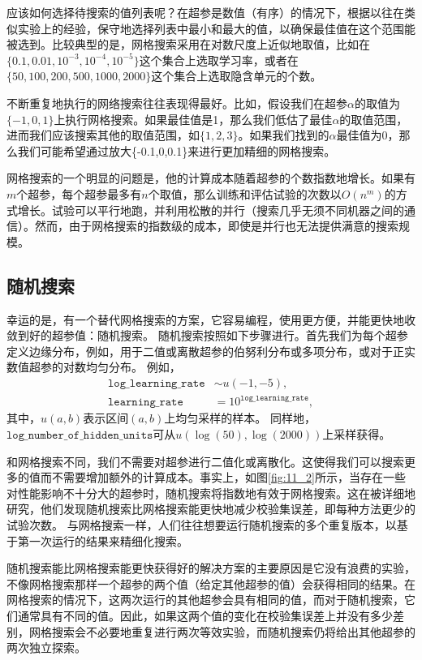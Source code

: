 应该如何选择待搜索的值列表呢？在超参是数值（有序）的情况下，根据以往在类似实验上的经验，保守地选择列表中最小和最大的值，以确保最佳值在这个范围能被选到。比较典型的是，网格搜索采用在对数尺度上近似地取值，比如在$\{0.1,0.01,10^{-3},10^{-4},10^{-5}\}$这个集合上选取学习率，或者在$\{50,100,200,500,1000,2000\}$这个集合上选取隐含单元的个数。

不断重复地执行的网络搜索往往表现得最好。比如，假设我们在超参$\alpha$的取值为$\{-1,0,1\}$上执行网格搜索。如果最佳值是1，那么我们低估了最佳$\alpha$的取值范围，进而我们应该搜索其他的取值范围，如$\{1,2,3\}$。如果我们找到的$\alpha$最佳值为0，那么我们可能希望通过放大\{-0.1,0,0.1\}来进行更加精细的网格搜索。

网格搜索的一个明显的问题是，他的计算成本随着超参的个数指数地增长。如果有$m$个超参，每个超参最多有$n$个取值，那么训练和评估试验的次数以$O(n^m)$的方式增长。试验可以平行地跑，并利用松散的并行（搜索几乎无须不同机器之间的通信）。然而，由于网格搜索的指数级的成本，即使是并行也无法提供满意的搜索规模。

\subsection{随机搜索}
\label{sec:11.4.4}

幸运的是，有一个替代网格搜索的方案，它容易编程，使用更方便，并能更快地收敛到好的超参值：随机搜索\citep{Bergstra+Bengio-2012-small}。
随机搜索按照如下步骤进行。首先我们为每个超参定义边缘分布，例如，用于二值或离散超参的伯努利分布或多项分布，或对于正实数值超参的对数均匀分布。 例如，
\begin{align}
        \texttt{log\_learning\_rate} &\sim u(-1, -5), \\
        \texttt{learning\_rate} &= 10^{\texttt{log\_learning\_rate}},
\end{align}
其中，$u(a,b)$表示区间$(a,b)$上均匀采样的样本。
同样地，$\texttt{log\_number\_of\_hidden\_units}$可从$u(\log(50), \log(2000))$上采样获得。

和网格搜索不同，我们不需要对超参进行二值化或离散化。这使得我们可以搜索更多的值而不需要增加额外的计算成本。事实上，如图\ref{fig:11_2}所示，当存在一些对性能影响不十分大的超参时，随机搜索将指数地有效于网格搜索。这在\cite{Bergstra+Bengio-2012-small}被详细地研究，他们发现随机搜索比网格搜索能更快地减少校验集误差，即每种方法更少的试验次数。
与网格搜索一样，人们往往想要运行随机搜索的多个重复版本，以基于第一次运行的结果来精细化搜索。

随机搜索能比网格搜索能更快获得好的解决方案的主要原因是它没有浪费的实验，不像网格搜索那样一个超参的两个值（给定其他超参的值）会获得相同的结果。在网格搜索的情况下，这两次运行的其他超参会具有相同的值，而对于随机搜索，它们通常具有不同的值。因此，如果这两个值的变化在校验集误差上并没有多少差别，网格搜索会不必要地重复进行两次等效实验，而随机搜索仍将给出其他超参的两次独立探索。

